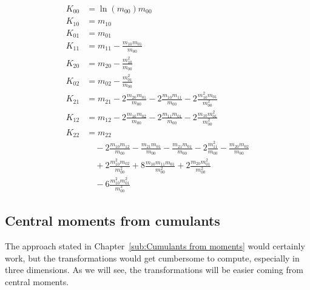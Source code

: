 \documentclass{article}
\begin{document}
\begin{align}
  K_{00} & = \ln(m_{00})m_{00} \label{eq: kappa_00 from moments}\\
  K_{10} & = m_{10} \label{eq: kappa_10 from moments}\\
  K_{01} & = m_{01} \label{eq: kappa_01 from moments}\\
  K_{11} & = m_{11} - \frac{m_{10}m_{01}}{m_{00}} \\
  K_{20} & = m_{20} - \frac{m_{10}^2}{m_{00}} \\
  K_{02} & = m_{02} - \frac{m_{01}^2}{m_{00}} \\
  K_{21} & = m_{21} - 2 \frac{m_{20} m_{01}}{m_{00}}
            - 2 \frac{m_{10} m_{11}}{m_{00}} - 2 \frac{m_{10}^2m_{01}}{m_{00}^2} \\
  K_{12} & = m_{12} - 2 \frac{m_{10} m_{02}}{m_{00}}
            - 2 \frac{m_{11} m_{01}}{m_{00}} - 2 \frac{m_{10}m_{01}^2}{m_{00}^2} \\
  K_{22} & = m_{22} \\
       & \quad - 2 \frac{m_{10}m_{12}}{m_{00}} - \frac{m_{21}m_{01}}{m_{00}}
       - \frac{m_{21}m_{01}}{m_{00}} - 2 \frac{m_{11}^2}{m_{00}} - \frac{m_{20}m_{02}}{m_{00}} \\
       & \quad + 2 \frac{m_{10}^2 m_{02}}{m_{00}^2} + 8 \frac{m_{10}m_{11}m_{01}}{m_{00}^2}
       + 2 \frac{m_{20}m_{01}^2}{m_{00}^2} \\
       & \quad - 6 \frac{m_{10}^2 m_{01}^2}{m_{00}^3}
\end{align}

\subsection{Central moments from cumulants}
\label{sub:Central moments from cumulants}
The approach stated in Chapter~\ref{sub:Cumulants from moments} would certainly work, but the transformations would get cumbersome to compute, especially in three dimensions. As we will see, the transformations will be easier coming from central moments.
\end{document}

